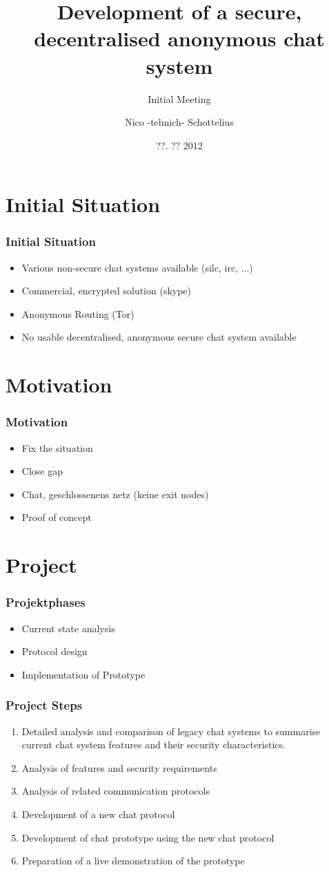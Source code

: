 \documentclass{beamer}
\title{Development of a secure, decentralised anonymous chat system}
\subtitle{Initial Meeting}
\author{Nico -telmich- Schottelius}
\date{??. ?? 2012}
\begin{document}
\frame{\titlepage}

\frame{\tableofcontents}

\section{Initial Situation}

\frame
{
  \frametitle{Initial Situation}
  \begin{itemize}
  \item Various non-secure chat systems available (silc, irc, ...)
  \item Commercial, encrypted solution (skype)
  \item Anonymous Routing (Tor)
  \item No usable decentralised, anonymous secure chat system available
  \end{itemize}
}

\section{Motivation}
\frame
{
  \frametitle{Motivation}
  \begin{itemize}
     \item Fix the situation
     \item Close gap
     \item Chat, geschlossenens netz (keine exit nodes)
     \item Proof of concept
  \end{itemize}
}

\section{Project}
\frame
{
  \frametitle{Projektphases}
  \begin{itemize}
     \item Current state analysis
     \item Protocol design
     \item Implementation of Prototype
  \end{itemize}
}

\frame
{
  \frametitle{Project Steps}
  \begin{enumerate}
     \item Detailed analysis and comparison of legacy chat systems
        to summarise current chat system features and their
        security characteristics.
    \item Analysis of features and security requirements
    \item Analysis of related communication protocols
    \item Development of a new chat protocol
    \item Development of chat prototype using the new chat protocol
    \item Preparation of a live demonstration of the prototype
  \end{enumerate}
}
\end{document}
